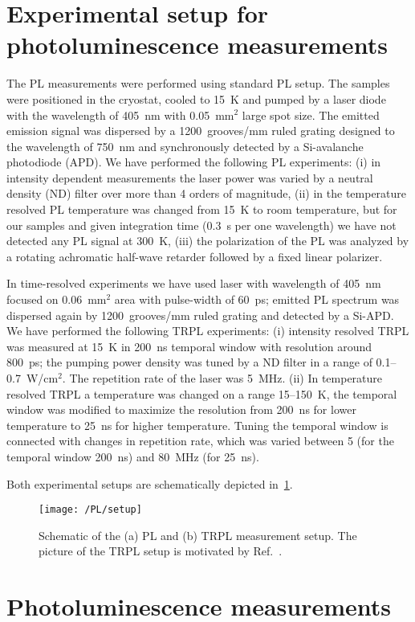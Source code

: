 \section{Experimental setup for photoluminescence measurements}
The PL measurements were performed using standard PL setup. The samples were positioned in the cryostat, cooled to 15~K and pumped by a laser diode with the wavelength of 405~nm with 0.05~mm$^2$ large spot size. The emitted emission signal was dispersed by a 1200~grooves/mm ruled grating designed to the wavelength of 750~nm and synchronously detected by a Si-avalanche photodiode (APD). We have performed the following PL experiments: (i) in intensity dependent measurements the laser power was varied by a neutral density (ND) filter over more than 4 orders of magnitude, (ii) in the temperature resolved PL temperature was changed from 15~K to room temperature, but for our samples and given integration time (0.3~s per one wavelength) we have not detected any PL signal at 300~K, (iii) the polarization of the PL was analyzed by a rotating achromatic half-wave retarder followed by a fixed linear polarizer.

In time-resolved experiments we have used laser with wavelength of 405~nm focused on 0.06~mm$^2$ area with pulse-width of 60~ps; emitted PL spectrum was dispersed again by 1200~grooves/mm ruled grating and detected by a Si-APD. We have performed the following TRPL experiments: (i) intensity resolved TRPL was measured at 15~K in 200~ns temporal window with resolution around 800~ps; the pumping power density was tuned by a ND filter in a range of 0.1--0.7~W/cm$^2$. The repetition rate of the laser was 5~MHz. (ii) In temperature resolved TRPL a temperature was changed on a range 15--150~K, the temporal window was modified to maximize the resolution from 200~ns for lower temperature to 25~ns for higher temperature. Tuning the temporal window is connected with changes in repetition rate, which was varied between 5 (for the temporal window 200~ns) and 80~MHz (for 25~ns).

Both experimental setups are schematically depicted in~\ref{fig:Madrid_setup}.
\begin{figure}
	\centering
	\texttt{[image: /PL/setup]}
	\caption{Schematic of the (a) PL and (b) TRPL measurement setup. The picture of the TRPL setup is motivated by Ref.~\citep{TRPL_setup}.}
	\label{fig:Madrid_setup}
\end{figure}


\newpage
\section{Photoluminescence measurements}

